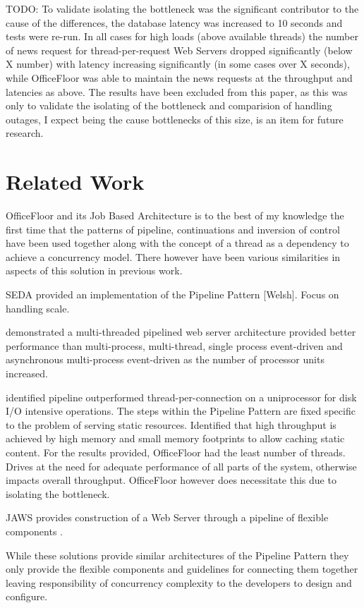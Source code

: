 \documentclass[conference]{ieee/IEEEtran}
\begin{document}
TODO: To validate isolating the bottleneck was the significant contributor to
the cause of the differences, the database latency was increased to 10 seconds
and tests were re-run.  In all cases for high loads (above available threads)
the number of news request for thread-per-request Web Servers dropped
significantly (below X number) with latency increasing significantly (in some
cases over X seconds), while OfficeFloor was able to maintain the news requests
at the throughput and latencies as above.  The results have been excluded from
this paper, as this was only to validate the isolating of the bottleneck and
comparision of handling outages, I expect being the cause bottlenecks of this
size, is an item for future research.


\section{Related Work}
OfficeFloor and its Job Based Architecture is to the best of my knowledge the
first time that the patterns of pipeline, continuations and inversion of
control have been used together along with the concept of a thread as a
dependency to achieve a concurrency model.  There however have been various
similarities in aspects of this solution in previous work.

SEDA provided an implementation of the Pipeline Pattern [Welsh]. Focus on
handling scale.

\cite{multithread-pipeline} demonstrated a multi-threaded pipelined web server
architecture provided better performance than multi-process, multi-thread,
single process event-driven and asynchronous multi-process event-driven as the
number of processor units increased.

\cite{knot-userver-watpipe} identified pipeline outperformed
thread-per-connection on a uniprocessor for disk I/O intensive operations. The
steps within the Pipeline Pattern are fixed specific to the problem of serving
static resources.  Identified that high throughput is achieved by high memory
and small memory footprints to allow caching static content.  For the results
provided, OfficeFloor had the least number of threads.  Drives at the need for
adequate performance of all parts of the system, otherwise impacts overall
throughput.  OfficeFloor however does necessitate this due to isolating the
bottleneck.

JAWS provides construction of a Web Server through a pipeline of flexible
components \cite{jaws}.

While these solutions provide similar architectures of the Pipeline Pattern
they only provide the flexible components and guidelines for connecting them
together leaving responsibility of concurrency complexity to the developers to
design and configure.
\end{document}
